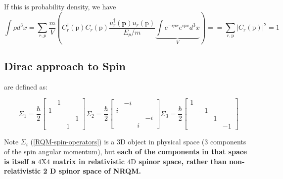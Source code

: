 If this is probability density, we have
$$
\int \rho d^{3} x=\sum_{r, p} \frac{m}{V}\left(C_{r}^{\dagger}(\mathrm{p}) C_{r}(\mathrm{p}) \frac{u_{r}^{\dagger}(\mathbf{p}) u_{r}(\mathrm{p})}{E_{p} / m} \underbrace{\int e^{-i p x}e^{ip x}d^{3} x}_{V}\right)==\sum_{r, \mathrm{p}}\left|C_{r}(\mathrm{p})\right|^{2}=1
$$

\subsection{Dirac approach to Spin}
 are defined as:
\begin{qt}
\begin{equation}
 \Sigma_{1}=\frac{\hbar}{2}\left[\begin{array}{cccc}
{} & {1} & {} & {} \\
{1} & {} & {} & {} \\
{} & {} & {} & {1} \\
{} & {} & {1} & {}
\end{array}\right] \Sigma_{2}=\frac{\hbar}{2}\left[\begin{array}{cccc}
{} & {-i} & {} & {} \\
{i} & {} & {} & {} \\
{} & {} & {} & {-i} \\
{} & {} & {i} & {}
\end{array}\right] \Sigma_{3}=\frac{\hbar}{2}\left[\begin{array}{cccc}
{1} & {} & {} & {} \\
{} & {-1} & {} & {} \\
{} & {} & {1} & {} \\
{} & {} & {} & {-1}
\end{array}\right]
\label{RQM-spin-operators}
\end{equation}
\end{qt}
Note $\Sigma_i$ (\ref{RQM-spin-operators}) is a $3 \mathrm{D}$ object in physical space (3 components of the spin angular momentum), but \textbf{each of the components in that space is itself a $4 \mathrm{X} 4$ matrix in relativistic $4 \mathrm{D}$ spinor space, rather than non-relativistic 2 D spinor space of NRQM.} 

